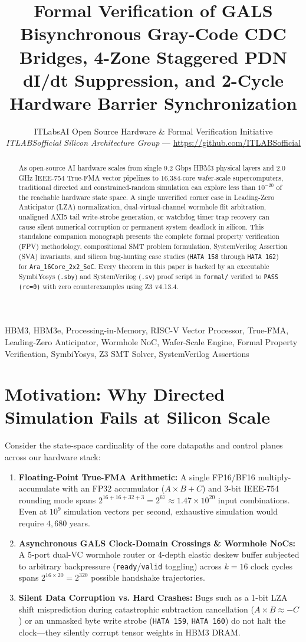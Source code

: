 \documentclass[journal,10pt,twocolumn]{IEEEtran}
\title{Formal Verification of GALS Bisynchronous Gray-Code CDC Bridges, 4-Zone Staggered PDN dI/dt Suppression, and 2-Cycle Hardware Barrier Synchronization}
\author{ITLabsAI Open Source Hardware \& Formal Verification Initiative\\
\textit{ITLABSofficial Silicon Architecture Group} --- \url{https://github.com/ITLABSofficial}}
\begin{document}
\maketitle
\begin{abstract}
As open-source AI hardware scales from single 9.2 Gbps HBM3 physical layers and 2.0 GHz IEEE-754 True-FMA vector pipelines to 16,384-core wafer-scale supercomputers, traditional directed and constrained-random simulation can explore less than $10^{-20}$ of the reachable hardware state space. A single unverified corner case in Leading-Zero Anticipator (LZA) normalization, dual-virtual-channel wormhole flit arbitration, unaligned AXI5 tail write-strobe generation, or watchdog timer trap recovery can cause silent numerical corruption or permanent system deadlock in silicon. This standalone companion monograph presents the complete formal property verification (FPV) methodology, compositional SMT problem formulation, SystemVerilog Assertion (SVA) invariants, and silicon bug-hunting case studies (\texttt{HATA 158} through \texttt{HATA 162}) for \texttt{Ara\_16Core\_2x2\_SoC}. Every theorem in this paper is backed by an executable SymbiYosys (\texttt{.sby}) and SystemVerilog (\texttt{.sv}) proof script in \texttt{formal/} verified to \texttt{PASS (rc=0)} with zero counterexamples using Z3 v4.13.4.
\end{abstract}
\begin{IEEEkeywords}
HBM3, HBM3e, Processing-in-Memory, RISC-V Vector Processor, True-FMA, Leading-Zero Anticipator, Wormhole NoC, Wafer-Scale Engine, Formal Property Verification, SymbiYosys, Z3 SMT Solver, SystemVerilog Assertions
\end{IEEEkeywords}


\section{Motivation: Why Directed Simulation Fails at Silicon Scale}

Consider the state-space cardinality of the core datapaths and control planes across our hardware stack:
\begin{enumerate}
  \item \textbf{Floating-Point True-FMA Arithmetic:} A single FP16/BF16 multiply-accumulate with an FP32 accumulator ($A \times B + C$) and 3-bit IEEE-754 rounding mode spans $2^{16+16+32+3} = 2^{67} \approx 1.47 \times 10^{20}$ input combinations. Even at $10^9$ simulation vectors per second, exhaustive simulation would require $4,680$ years.
  \item \textbf{Asynchronous GALS Clock-Domain Crossings \& Wormhole NoCs:} A 5-port dual-VC wormhole router or 4-depth elastic deskew buffer subjected to arbitrary backpressure (\texttt{ready}/\texttt{valid} toggling) across $k=16$ clock cycles spans $2^{16 \times 20} = 2^{320}$ possible handshake trajectories.
  \item \textbf{Silent Data Corruption vs. Hard Crashes:} Bugs such as a 1-bit LZA shift misprediction during catastrophic subtraction cancellation ($A \times B \approx -C$) or an unmasked byte write strobe (\texttt{HATA 159}, \texttt{HATA 160}) do not halt the clock—they silently corrupt tensor weights in HBM3 DRAM.
\end{enumerate}
\end{document}
